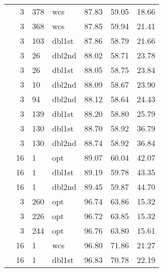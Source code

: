 \begin{tabular}{cr@{.}lllll}
	  & 3      & 378   & wcs    & 87.83      & 59.05          & 18.66 \\ 
	  & 3      & 368   & wcs    & 87.85      & 59.94          & 21.41 \\ 
	  & 3      & 103   & dbl1st & 87.86      & 58.79          & 21.66 \\ 
	  & 3      & 26    & dbl2nd & 88.02      & 58.71          & 23.78 \\ 
	  & 3      & 26    & dbl1st & 88.05      & 58.75          & 23.84 \\ 
	  & 3      & 10    & dbl2nd & 88.09      & 58.67          & 23.90 \\ 
	  & 3      & 94    & dbl2nd & 88.12      & 58.64          & 24.43 \\ 
	  & 3      & 139   & dbl1st & 88.20      & 58.80          & 25.79 \\ 
	  & 3      & 130   & dbl1st & 88.70      & 58.92          & 36.79 \\ 
	  & 3      & 130   & dbl2nd & 88.74      & 58.92          & 36.84 \\ 
	  & 16     & 1     & opt    & 89.07      & 60.04          & 42.07 \\ 
	  & 16     & 1     & dbl1st & 89.19      & 59.78          & 43.35 \\ 
	  & 16     & 1     & dbl2nd & 89.45      & 59.87          & 44.70 \\ 
	\midrule \multirow{5}{*}{\frnd{10}{10}} 
	  & 3      & 260   & opt    & 96.74      & 63.86          & 15.32 \\ 
	  & 3      & 226   & opt    & 96.72      & 63.85          & 15.32 \\ 
	  & 3      & 244   & opt    & 96.76      & 63.80          & 15.61 \\ 
	  & 16     & 1     & wcs    & 96.80      & 71.86          & 21.27 \\ 
	  & 16     & 1     & dbl1st & 96.83      & 70.78          & 22.19 \\ 
	\bottomrule
\end{tabular}